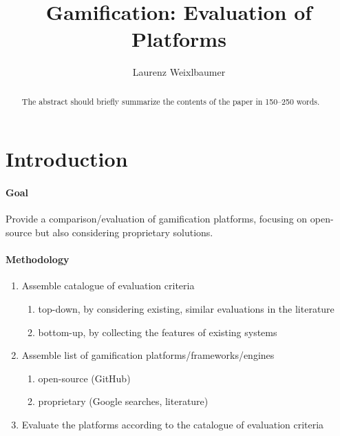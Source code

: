 \documentclass[runningheads]{llncs}
\begin{document}
\nocite{*}

\title{Gamification: Evaluation of Platforms}
\author{Laurenz Weixlbaumer}
\maketitle
 
\begin{abstract}
The abstract should briefly summarize the contents of the paper in
150--250 words.
\end{abstract}
\clearpage

\tableofcontents
\listoffigures
\listoftables
\clearpage

\section{Introduction}

\paragraph{Goal} Provide a comparison/evaluation of gamification platforms, focusing on open-source but also considering proprietary solutions.

\paragraph{Methodology}
\begin{enumerate}
    \item Assemble catalogue of evaluation criteria
    \begin{enumerate}
        \item top-down, by considering existing, similar evaluations in the literature
        \item bottom-up, by collecting the features of existing systems
    \end{enumerate}
    \item Assemble list of gamification platforms/frameworks/engines
    \begin{enumerate}
        \item open-source (GitHub)
        \item proprietary (Google searches, literature)
    \end{enumerate}
    \item Evaluate the platforms according to the catalogue of evaluation criteria 
\end{enumerate}
\end{document}
